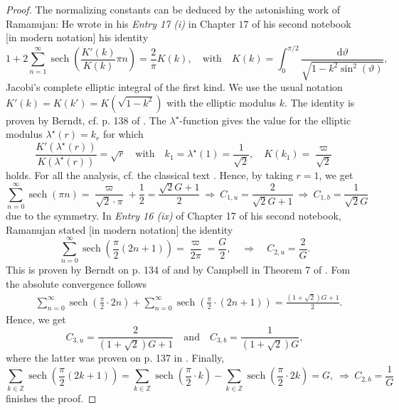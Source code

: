 \documentclass[12pt]{amsart}
\theoremstyle{definition}
\theoremstyle{remark}
\numberwithin{equation}{section}
\newcommand{\1}{\mathbbm{1}}
\begin{document}
\begin{proof}
The normalizing constants can be deduced by the astonishing work of Ramanujan: He wrote in his \textit{Entry 17 (i)} in Chapter $17$ of his second notebook [in modern notation] his identity
\begin{equation}\label{form:ramanujan_1}
1 + 2 \sum_{n=1}^\infty \operatorname{sech}\left(\frac{K'(k)}{K(k)} \pi n\right) = \frac{2}{\pi} K(k), \quad \mathrm{with} \quad K(k) = \int_0^{\pi/2} \frac{\mathrm{d}\vartheta}{\sqrt{1-k^2\sin^2(\vartheta)}},
\end{equation}
Jacobi's complete elliptic integral of the first kind. We use the usual notation $K'(k) = K(k') = K(\sqrt{1-k^2})$ with the elliptic modulus $k$. The identity is proven by Berndt, cf. p. 138 of \cite{ramanujan_1991}. The $\lambda^\star$-function gives the value for the elliptic modulus $\lambda^\star(r)=k_r$ for which
\begin{equation}\label{form:elliptic_modulus}
\frac{K'(\lambda^\star(r))}{K(\lambda^\star(r))} = \sqrt{r} \quad \mathrm{with} \quad k_1 = \lambda^\star(1) = \frac{1}{\sqrt{2}}, \quad K(k_1) = \frac{\varpi}{\sqrt{2}}
\end{equation}
holds. For all the analysis, cf. the classical text  \cite{whittaker_1920}. Hence, by taking $r=1$, we get
$$
\sum_{n=0}^\infty \operatorname{sech}(\pi n) = \frac{\varpi}{\sqrt{2} \cdot \pi} + \frac{1}{2} = \frac{\sqrt{2} G + 1}{2} \ \Rightarrow \ C_{1,u} = \frac{2}{\sqrt{2}G + 1} \ \Rightarrow \ C_{1,b} = \frac{1}{\sqrt{2}G}
$$
due to the symmetry. In \textit{Entry 16 (ix)} of Chapter 17 of his second notebook, Ramanujan stated [in modern notation] the identity
$$
\sum_{n=0}^\infty \operatorname{sech}\left(\frac{\pi}{2} (2n+1)\right) = \frac{\varpi}{2 \pi} = \frac{G}{2}, \quad \Rightarrow \quad C_{2,u} = \frac{2}{G}.
$$
This is proven by Berndt on p. 134 of \cite{ramanujan_1991} and by Campbell in Theorem 7 of \cite{campbell_2023}. Fom  the absolute convergence follows
\begin{align*}
 & \sum_{n=0}^\infty \operatorname{sech}\left(\frac{\pi}{2}\cdot 2n \right) + \sum_{n=0}^\infty \operatorname{sech}\left(\frac{\pi}{2} \cdot (2n + 1)\right) = \frac{(1+\sqrt{2})G + 1}{2}.
\end{align*}
Hence, we get
$$
C_{3,u} = \frac{2}{(1+\sqrt{2})G + 1} \quad \mathrm{and} \quad C_{3,b} = \frac{1}{(1+\sqrt{2})G},
$$
where the latter was proven on p. 137 in \cite{ramanujan_1991}. Finally, 
$$
\sum_{k \in \mathbb{Z}} \operatorname{sech}\left(\frac{\pi}{2}(2k+1)\right) = \sum_{k \in \mathbb{Z}} \operatorname{sech}\left(\frac{\pi}{2} \cdot k\right) - \sum_{k\in \mathbb{Z}} \operatorname{sech} \left(\frac{\pi}{2} \cdot 2k\right) = G, \ \Rightarrow \ C_{2,b} = \frac{1}{G}
$$
finishes the proof.
\end{proof}
\end{document}
